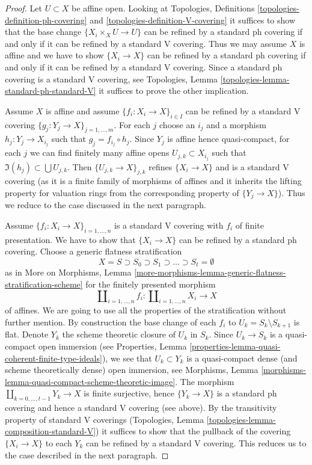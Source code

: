 \begin{proof}
Let $U \subset X$ be affine open. Looking at
Topologies, Definitions \ref{topologies-definition-ph-covering}
and \ref{topologies-definition-V-covering} it suffices to show that
the base change $\{X_i \times_X U \to U\}$ can be refined
by a standard ph covering if and only if it can be refined by
a standard V covering. Thus we may assume $X$ is affine and we have to show
$\{X_i \to X\}$ can be refined by a standard ph covering
if and only if it can be refined by a standard V covering.
Since a standard ph covering is a standard V covering, see
Topologies, Lemma \ref{topologies-lemma-standard-ph-standard-V}
it suffices to prove the other implication.

\medskip\noindent
Assume $X$ is affine and assume $\{f_i : X_i \to X\}_{i \in I}$
can be refined by a standard V covering
$\{g_j : Y_j \to X\}_{j = 1, \ldots, m}$.
For each $j$ choose an $i_j$ and a morphism
$h_j : Y_j \to X_{i_j}$ such that $g_j = f_{i_j} \circ h_j$.
Since $Y_j$ is affine hence quasi-compact,
for each $j$ we can find finitely many affine opens
$U_{j, k} \subset X_{i_j}$ such that $\Im(h_j) \subset \bigcup U_{j, k}$.
Then $\{U_{j, k} \to X\}_{j, k}$ refines $\{X_i \to X\}$
and is a standard V covering (as it is a finite family of morphisms
of affines and it inherits the lifting property for valuation rings
from the corresponding property of $\{Y_j \to X\}$).
Thus we reduce to the case discussed in the next paragraph.

\medskip\noindent
Assume $\{f_i : X_i \to X\}_{i = 1, \ldots, n}$
is a standard V covering with $f_i$ of finite presentation.
We have to show that $\{X_i \to X\}$ can be refined by a standard ph covering.
Choose a generic flatness stratification
$$
X = S \supset S_0 \supset S_1 \supset \ldots \supset S_t = \emptyset
$$
as in More on Morphisms, Lemma
\ref{more-morphisms-lemma-generic-flatness-stratification-scheme}
for the finitely presented morphism
$$
\coprod\nolimits_{i = 1, \ldots, n} f_i :
\coprod\nolimits_{i = 1, \ldots, n} X_i
\longrightarrow
X
$$
of affines. We are going to use all the properties of the stratification
without further mention. By construction the base change of each $f_i$ to
$U_k = S_k \setminus S_{k + 1}$ is flat.
Denote $Y_k$ the scheme theoretic closure of $U_k$ in $S_k$. Since
$U_k \to S_k$ is a quasi-compact open immersion (see
Properties, Lemma \ref{properties-lemma-quasi-coherent-finite-type-ideals}),
we see that $U_k \subset Y_k$ is a quasi-compact dense
(and scheme theoretically dense) open immersion, see
Morphisms, Lemma \ref{morphisms-lemma-quasi-compact-scheme-theoretic-image}.
The morphism $\coprod_{k = 0, \ldots, t - 1} Y_k \to X$
is finite surjective, hence $\{Y_k \to X\}$ is a standard ph covering
and hence a standard V covering (see above). By the transitivity
property of standard V coverings
(Topologies, Lemma \ref{topologies-lemma-composition-standard-V})
it suffices to show that the pullback of
the covering $\{X_i \to X\}$ to each $Y_k$ can be refined by a
standard V covering. This reduces us to the case described in the
next paragraph.


\end{proof}
